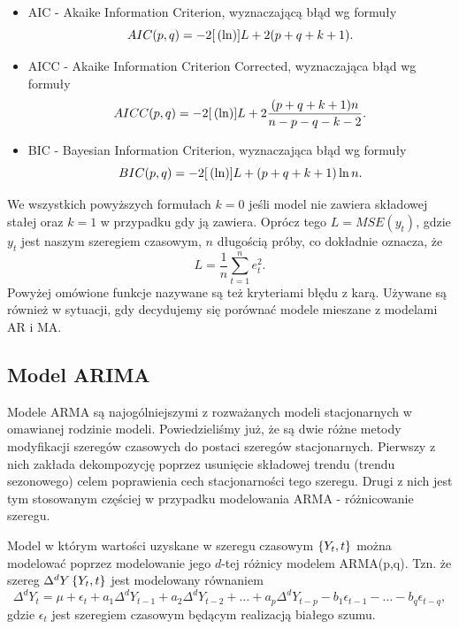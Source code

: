 \documentclass[10pt,a4paper]{book}
\begin{document}
\begin{itemize}
\item AIC - Akaike Information Criterion, wyznaczającą błąd wg formuły 
$$
AIC(p,q) = -2 {{[}\left( {\ln} \right)}]{L} + 2 {\left( {p+q+k+1} \right)}.
$$
\item AICC - Akaike Information Criterion Corrected, wyznaczająca błąd wg formuły 
$$
AICC(p,q) = -2 {{[}\left( {\ln} \right)}]{L} + 2 \frac{{\left( {p+q+k+1} \right)}  n}{n-p-q-k-2}.
$$
\item BIC - Bayesian Information Criterion, wyznaczająca błąd wg formuły
$$
BIC(p,q) = -2 {{[}\left( {\ln} \right)}]{L} + {\left( {p+q+k+1} \right)} \ln n.
$$
\end{itemize}
We wszystkich powyższych formułach $k=0$ jeśli model nie zawiera składowej stałej oraz $k=1$ w przypadku gdy ją zawiera. Oprócz tego $L=MSE(y_t)$, gdzie $y_t$ jest naszym szeregiem czasowym, $n$ długością próby, co dokładnie oznacza, że 
$$
L = \frac{1}{n} \sum_{t=1}^{n} e_t^2.
$$
Powyżej omówione funkcje nazywane są też kryteriami błędu z karą. Używane są również w sytuacji, gdy decydujemy się porównać modele mieszane z modelami AR i MA.

\subsection{Model ARIMA}

Modele ARMA są najogólniejszymi z rozważanych modeli stacjonarnych w omawianej rodzinie modeli. Powiedzieliśmy już, że są dwie różne metody modyfikacji szeregów czasowych do postaci szeregów stacjonarnych. Pierwszy z nich zakłada dekompozycję poprzez usunięcie składowej trendu (trendu sezonowego) celem poprawienia cech stacjonarności tego szeregu. Drugi z nich jest tym stosowanym częściej w przypadku modelowania ARMA - różnicowanie szeregu.

\begin{definition} 
Model w którym wartości uzyskane w szeregu czasowym $\left\lbrace {{Y_t}, {t}} \right\rbrace$ można modelować poprzez modelowanie jego $d$-tej różnicy modelem ARMA(p,q). Tzn. że szereg $\Delta^d Y\left\lbrace {{Y_t}, {t}} \right\rbrace$ jest modelowany równaniem 
$$
\Delta^d Y_t = \mu + \epsilon_t + a_1 \Delta^d Y_{t-1} + a_2 \Delta^d Y_{t-2} + \ldots + a_p \Delta^d Y_{t-p} - b_1 \epsilon_{t-1} -\ldots - b_q \epsilon_{t-q} ,
$$
gdzie $\epsilon_t $ jest szeregiem czasowym będącym realizacją białego szumu.
\end{definition}
\end{document}
